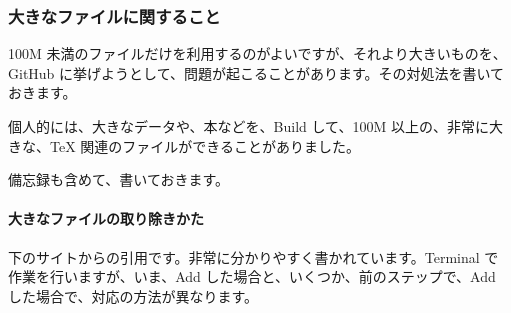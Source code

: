 \documentclass[
]{bxjsbook}
\theoremstyle{definition}
\theoremstyle{definition}
\theoremstyle{definition}
\theoremstyle{definition}
\theoremstyle{remark}
\begin{document}
\hypertarget{ux5927ux304dux306aux30d5ux30a1ux30a4ux30ebux306bux95a2ux3059ux308bux3053ux3068}{%
\subsubsection{大きなファイルに関すること}\label{ux5927ux304dux306aux30d5ux30a1ux30a4ux30ebux306bux95a2ux3059ux308bux3053ux3068}}

100M 未満のファイルだけを利用するのがよいですが、それより大きいものを、GitHub に挙げようとして、問題が起こることがあります。その対処法を書いておきます。

個人的には、大きなデータや、本などを、Build して、100M 以上の、非常に大きな、TeX 関連のファイルができることがありました。

備忘録も含めて、書いておきます。

\hypertarget{ux5927ux304dux306aux30d5ux30a1ux30a4ux30ebux306eux53d6ux308aux9664ux304dux304bux305f}{%
\paragraph{大きなファイルの取り除きかた}\label{ux5927ux304dux306aux30d5ux30a1ux30a4ux30ebux306eux53d6ux308aux9664ux304dux304bux305f}}

下のサイトからの引用です。非常に分かりやすく書かれています。Terminal で作業を行いますが、いま、Add した場合と、いくつか、前のステップで、Add した場合で、対応の方法が異なります。
\end{document}
